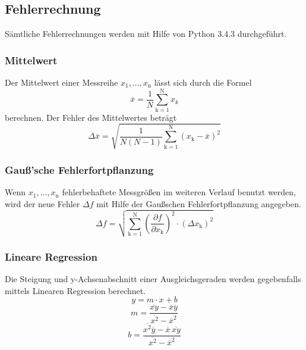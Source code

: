 \subsection{Fehlerrechnung}
Sämtliche Fehlerrechnungen werden mit Hilfe von Python 3.4.3 durchgeführt.
\subsubsection{Mittelwert}
Der Mittelwert einer Messreihe $x_\text{1}, ... ,x_\text{n}$ lässt sich durch die Formel
\begin{equation}
	\overline{x} = \frac{1}{N} \sum_{\text{k}=1}^\text{N} x_k
	\label{eqn:ave}
\end{equation}
berechnen. Der Fehler des Mittelwertes beträgt
\begin{equation}
	\Delta \overline{x} = \sqrt{ \frac{1}{N(N-1)} \sum_{\text{k}=1}^\text{N} (x_\text{k} - \overline{x})^2}
	\label{eqn:std}
\end{equation}

\subsubsection{Gauß'sche Fehlerfortpflanzung}
Wenn $x_\text{1}, ..., x_\text{n}$ fehlerbehaftete Messgrößen im weiteren Verlauf benutzt werden, wird der neue Fehler $\Delta f$ mit Hilfe der Gaußschen Fehlerfortpflanzung angegeben.
\begin{equation}
	\Delta f = \sqrt{\sum_{\text{k}=1}^\text{N} \left( \frac{ \partial f}{\partial x_\text{k}} \right) ^2 \cdot (\Delta x_\text{k})^2}
	\label{eqn:var}
\end{equation}

\subsubsection{Lineare Regression}
Die Steigung und y-Achsenabschnitt einer Ausgleichsgeraden werden gegebenfalls mittels Linearen Regression berechnet.
\begin{equation}
	y = m \cdot x + b
	\label{eqn:reg}
\end{equation}
\begin{equation}
	m = \frac{ \overline{xy} - \overline{x} \overline{y} } {\overline{x^2} - \overline{x}^2}
	\label{eqn:reg_m}
\end{equation}
\begin{equation}
	b = \frac{ \overline{x^2}\overline{y} - \overline{x} \, \overline{xy}} { \overline{x^2} - \overline{x}^2}
	\label{eqn:reg_b}
\end{equation}
